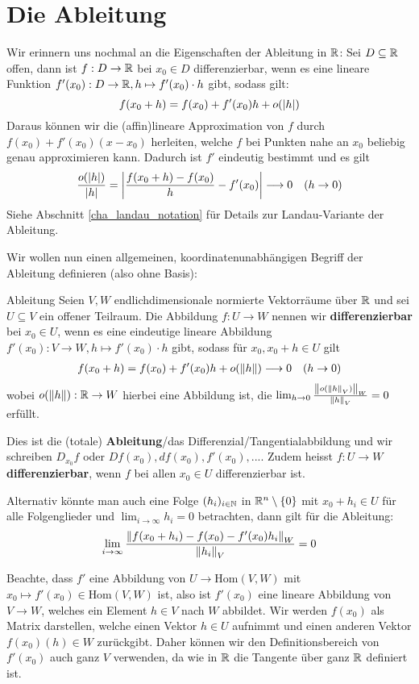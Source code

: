 \section{Die Ableitung}
Wir erinnern uns nochmal an die Eigenschaften der Ableitung in $\mathbb{R}$: Sei $D \subseteq \mathbb{R}$ offen, dann ist $f: D \to \mathbb{R}$ bei $x_0 \in D$ differenzierbar, wenn es eine lineare Funktion $f'(x_0): D \to \mathbb{R}, h \mapsto f'(x_0) \cdot h$ gibt, sodass gilt:
$$f(x_0 + h) = f(x_0) + f'(x_0)h + o(\left|h\right|)$$
Daraus können wir die (affin)lineare Approximation von $f$ durch $f(x_0) + f'(x_0)(x-x_0)$ herleiten, welche $f$ bei Punkten nahe an $x_0$ beliebig genau approximieren kann.
Dadurch ist $f'$ eindeutig bestimmt und es gilt
$$\frac{o(\left|h\right|)}{\left|h\right|} = \left|\frac{f(x_0+h)- f(x_0)}{h} - f'(x_0)\right| \longrightarrow 0 \quad (h \to 0)$$
Siehe Abschnitt \ref{cha_landau_notation} für Details zur Landau-Variante der Ableitung.

Wir wollen nun einen allgemeinen, koordinatenunabhängigen Begriff der Ableitung definieren (also ohne Basis):
\begin{definition}{Ableitung}{}
Seien $V,W$ endlichdimensionale normierte Vektorräume über $\mathbb{R}$ und sei $U \subseteq V$ ein offener Teilraum. Die Abbildung $f: U \to W$ nennen wir \textbf{differenzierbar} bei $x_0 \in U$, wenn es eine eindeutige lineare Abbildung $f'(x_0): V \to W, h \mapsto f'(x_0)\cdot h$ gibt, sodass für $x_0, x_0+h \in U$ gilt
\begin{align}\label{eq_totales_differential}
    f(x_0+h) = f(x_0) + f'(x_0) h + o(\left\|h\right\|) \longrightarrow 0 \quad (h \to 0)
\end{align}
wobei $o(\left\|h\right\|): \mathbb{R} \to W$ hierbei eine Abbildung ist, die $\lim_{h \to 0} \frac{\left\|o(\left\|h\right\|_V)\right\|_W}{\left\|h\right\|_V} = 0$ erfüllt.

Dies ist die (totale) \textbf{Ableitung}/das Differenzial/Tangentialabbildung und wir schreiben $D_{x_0}f$ oder $Df(x_0), df(x_0),f'(x_0),...$. Zudem heisst $f: U \to W$ \textbf{differenzierbar}, wenn $f$ bei allen $x_0 \in U$ differenzierbar ist.
\end{definition}
Alternativ könnte man auch eine Folge $(h_{i})_{i \in \mathbb{N}}$ in $\mathbb{R}^n\setminus\{0\}$ mit $x_0 + h_i \in U$ für alle Folgenglieder und $\lim_{i \to \infty} h_i = 0$ betrachten, dann gilt für die Ableitung:
$$\lim_{i \to \infty}\frac{\left\|f(x_0 + h_i) - f(x_0)  - f'(x_0) h_i\right\|_W}{\left\|h_i\right\|_V} = 0$$
\begin{remark}
Beachte, dass $f'$ eine Abbildung von $U \to \text{Hom}(V, W)$ mit $x_0 \mapsto f'(x_0) \in \text{Hom}(V, W)$ ist, also ist $f'(x_0)$ eine lineare Abbildung von $V \to W$, welches ein Element $h \in V$ nach $W$ abbildet. Wir werden $f(x_0)$ als Matrix darstellen, welche einen Vektor $h \in U$ aufnimmt und einen anderen Vektor $f(x_0)(h) \in W$ zurückgibt. Daher können wir den Definitionsbereich von $f'(x_0)$ auch ganz $V$ verwenden, da wie in $\mathbb{R}$ die Tangente über ganz $\mathbb{R}$ definiert ist.
\end{remark}

